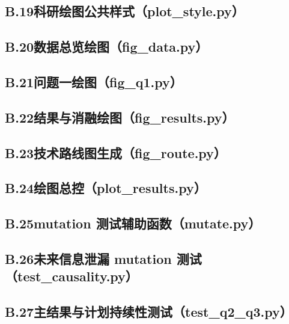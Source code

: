 \subsection*{B.19\quad 科研绘图公共样式（plot\_style.py）}


\subsection*{B.20\quad 数据总览绘图（fig\_data.py）}


\subsection*{B.21\quad 问题一绘图（fig\_q1.py）}


\subsection*{B.22\quad 结果与消融绘图（fig\_results.py）}


\subsection*{B.23\quad 技术路线图生成（fig\_route.py）}


\subsection*{B.24\quad 绘图总控（plot\_results.py）}


\subsection*{B.25\quad mutation 测试辅助函数（mutate.py）}


\subsection*{B.26\quad 未来信息泄漏 mutation 测试（test\_causality.py）}


\subsection*{B.27\quad 主结果与计划持续性测试（test\_q2\_q3.py）}


